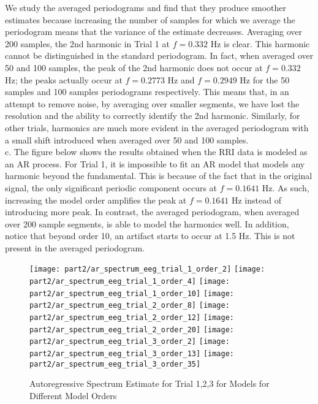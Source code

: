\noindent{}We study the averaged periodograms and find that they produce smoother estimates because increasing the number of samples for which we average the periodogram means that the variance of the estimate decreases. Averaging over 200 samples, the 2nd harmonic in Trial 1 at $f=0.332$ Hz is clear. This harmonic cannot be distinguished in the standard periodogram. In fact, when averaged over 50 and 100 samples, the peak of the 2nd harmonic does not occur at $f=0.332$ Hz; the peaks actually occur at $f=0.2773$ Hz and $f=0.2949$ Hz for the 50 samples and 100 samples periodograms respectively. This means that, in an attempt to remove noise, by averaging over smaller segments, we have lost the resolution and the ability to correctly identify the 2nd harmonic. Similarly, for other trials, harmonics are much more evident in the averaged periodogram with a small shift introduced when averaged over 50 and 100 samples.\\

\noindent{}c. The figure below shows the results obtained when the RRI data is modeled as an AR process. For Trial 1, it is impossible to fit an AR model that models any harmonic beyond the fundamental. This is because of the fact that in the original signal, the only significant periodic component occurs at $f=0.1641$ Hz. As such, increasing the model order amplifies the peak at $f=0.1641$ Hz instead of introducing more peak. In contrast, the averaged periodogram, when averaged over 200 sample segments, is able to model the harmonics well. In addition, notice that beyond order 10, an artifact starts to occur at 1.5 Hz. This is not present in the averaged periodogram.

\begin{figure}[H]
\centering{}
\texttt{[image: part2/ar\_spectrum\_eeg\_trial\_1\_order\_2]}
\texttt{[image: part2/ar\_spectrum\_eeg\_trial\_1\_order\_4]}
\texttt{[image: part2/ar\_spectrum\_eeg\_trial\_1\_order\_10]}
\texttt{[image: part2/ar\_spectrum\_eeg\_trial\_2\_order\_8]}
\texttt{[image: part2/ar\_spectrum\_eeg\_trial\_2\_order\_12]}
\texttt{[image: part2/ar\_spectrum\_eeg\_trial\_2\_order\_20]}
\texttt{[image: part2/ar\_spectrum\_eeg\_trial\_3\_order\_2]}
\texttt{[image: part2/ar\_spectrum\_eeg\_trial\_3\_order\_13]}
\texttt{[image: part2/ar\_spectrum\_eeg\_trial\_3\_order\_35]}
\caption{Autoregressive Spectrum Estimate for Trial 1,2,3 for Models for Different Model Orders}
\end{figure}

